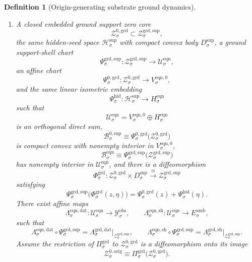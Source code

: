 \documentclass[11pt]{article}
\newcommand{\DataSpace}[1]{\mathcal Y_{#1}^{\mathrm{obs}}}
\newcommand{\AmbientTarget}[1]{E_{#1}^{\mathrm{amb}}}
\newcommand{\SeedHidden}[1]{\mathcal H_{#1}^{\mathrm{sup}}}
\newcommand{\SeedHiddenBody}[1]{D_{#1}^{\mathrm{sup}}}
\newcommand{\HiddenChart}[1]{\Psi_{#1}^{\mathrm{hid}}}
\newcommand{\ZeroBody}[1]{\mathcal B_{#1}^{0,\mathrm{sup}}}
\newcommand{\OrigZeroCore}[1]{\mathcal Z_{#1}^{0,\mathrm{orig}}}
\newcommand{\GroundProj}[1]{\Pi_{#1}^{\mathrm{grd}}}
\newcommand{\GroundData}[1]{\Lambda_{#1}^{\mathrm{grd,dat}}}
\newcommand{\GroundShellMap}[1]{\Lambda_{#1}^{\mathrm{grd,sh}}}
\newcommand{\GroundSupportShell}[1]{\mathcal Z_{#1}^{\mathrm{grd,sup}}}
\newcommand{\GroundZeroCore}[1]{\mathcal Z_{#1}^{0,\mathrm{grd}}}
\newcommand{\GroundEqChart}[1]{\Psi_{#1}^{\mathrm{grd,sup}}}
\newcommand{\GroundZeroChart}[1]{\Psi_{#1}^{0,\mathrm{grd}}}
\newcommand{\GroundSplit}[1]{\Phi_{#1}^{\mathrm{grd}}}
\newcommand{\EqnSpace}[1]{\mathcal U_{#1}^{\mathrm{eqn}}}
\newcommand{\EqnData}[1]{\Lambda_{#1}^{\mathrm{eqn,dat}}}
\newcommand{\EqnShell}[1]{\Lambda_{#1}^{\mathrm{eqn,sh}}}
\newcommand{\EqnHidden}[1]{H_{#1}^{\mathrm{eqn}}}
\newcommand{\EqnZero}[1]{V_{#1}^{\mathrm{eqn},0}}
\newcommand{\EqnBody}[1]{\mathcal B_{#1}^{\mathrm{eqn}}}
\newtheorem{definition}{Definition}
\begin{document}
\begin{definition}[Origin-generating substrate ground dynamics]
\begin{enumerate}
    \item A closed embedded ground support zero core
    \[
    \GroundZeroCore{\sigma}\subset\GroundSupportShell{\sigma},
    \]
    the same hidden-seed space \(\SeedHidden{\sigma}\) with compact convex body \(\SeedHiddenBody{\sigma}\), a ground support-shell chart
    \[
    \GroundEqChart{\sigma}:\GroundSupportShell{\sigma}\to\EqnSpace{\sigma},
    \]
    an affine chart
    \[
    \GroundZeroChart{\sigma}:\GroundZeroCore{\sigma}\to\EqnZero{\sigma},
    \]
    and the same linear isometric embedding
    \[
    \HiddenChart{\sigma}:\SeedHidden{\sigma}\to\EqnHidden{\sigma}
    \]
    such that
    \[
    \EqnSpace{\sigma}
    =
    \EqnZero{\sigma}\oplus\EqnHidden{\sigma}
    \]
    is an orthogonal direct sum,
    \[
    \ZeroBody{\sigma}
    \equiv
    \GroundZeroChart{\sigma}\bigl(\GroundZeroCore{\sigma}\bigr)
    \]
    is compact convex with nonempty interior in \(\EqnZero{\sigma}\),
    \[
    \EqnBody{\sigma}
    \equiv
    \GroundEqChart{\sigma}\bigl(\GroundSupportShell{\sigma}\bigr)
    \]
    has nonempty interior in \(\EqnSpace{\sigma}\), and there is a diffeomorphism
    \begin{equation}
    \GroundSplit{\sigma}:
    \GroundZeroCore{\sigma}\times\SeedHiddenBody{\sigma}
    \xrightarrow{\cong}
    \GroundSupportShell{\sigma}
    \label{eq:groundsplit}
    \end{equation}
    satisfying
    \begin{equation}
    \GroundEqChart{\sigma}\bigl(\GroundSplit{\sigma}(z,\eta)\bigr)
    =
    \GroundZeroChart{\sigma}(z)+\HiddenChart{\sigma}(\eta).
    \label{eq:groundchartsplit}
    \end{equation}
    There exist affine maps
    \[
    \EqnData{\sigma}:\EqnSpace{\sigma}\to\DataSpace{\sigma},
    \qquad
    \EqnShell{\sigma}:\EqnSpace{\sigma}\to\AmbientTarget{\sigma},
    \]
    such that
    \begin{equation}
    \EqnData{\sigma}\circ\GroundEqChart{\sigma}
    =
    \GroundData{\sigma}\big|_{\GroundSupportShell{\sigma}},
    \qquad
    \EqnShell{\sigma}\circ\GroundEqChart{\sigma}
    =
    \GroundShellMap{\sigma}\big|_{\GroundSupportShell{\sigma}}.
    \label{eq:groundeqnchartreadouts}
    \end{equation}
    Assume the restriction of \(\GroundProj{\sigma}\) to \(\GroundZeroCore{\sigma}\) is a diffeomorphism onto its image
    \[
    \OrigZeroCore{\sigma}
    \equiv
    \GroundProj{\sigma}\bigl(\GroundZeroCore{\sigma}\bigr).
    \]


\end{enumerate}
\end{definition}
\end{document}
